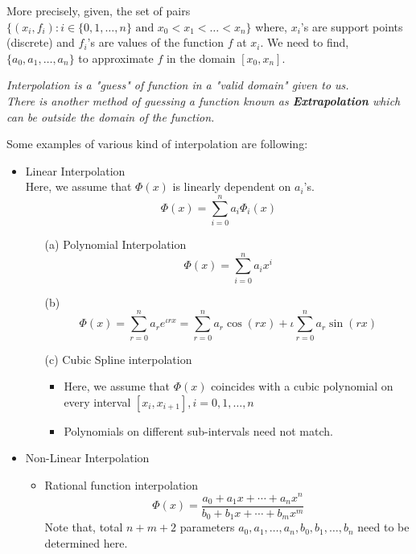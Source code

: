 More precisely, given, the set of pairs $\{(x_i,f_i): i \in \{0,1,\ldots,n\} \text{ and } x_0 < x_1 < \ldots < x_n \}$ where, $x_i$'s are support points (discrete) and $f_i$'s are values of the function $f$ at $x_i$. We need to find, $\{a_0,a_1,\ldots,a_n\}$ to approximate $f$ in the domain $[x_0,x_n]$.

\begin{rmk}
	\textit{Interpolation is a "guess" of function in a "valid domain" given to us. \\
		There is another method of guessing a function known as \textbf{Extrapolation} which can be outside the domain of the function.}
\end{rmk}



\begin{example}
	Some examples of various kind of interpolation are following:
	\begin{itemize}
		\item Linear Interpolation
		      \\ Here, we assume that $ \Phi(x) $ is linearly dependent on $a_i$'s.
		      \[
			      \Phi(x) = \sum_{i=0}^{n}a_i\Phi_i(x)
		      \]
		      \begin{itemize}
			      \item[(a)] Polynomial Interpolation
				      \[\Phi(x) = \sum_{i=0}^{n}a_ix^i\]
			      \item[(b)] \[\Phi(x) = \sum_{r=0}^{n}a_re^{\iota rx} = \sum_{r=0}^{n}a_r\cos(rx) + \iota\sum_{r=0}^{n}a_r\sin(rx) \]
			      \item[(c)] Cubic Spline interpolation
				      \begin{itemize}
					      \item Here, we assume that $ \Phi(x) $ coincides with a cubic polynomial on every interval $ [x_i,x_{i+1}], i = 0,1,\ldots,n $
					      \item Polynomials on different sub-intervals need not match.
				      \end{itemize}
		      \end{itemize}
		\item Non-Linear Interpolation
		      \begin{itemize}
			      \item Rational function interpolation
			            \[
				            \Phi(x) = \frac{a_0+a_1x+\cdots+a_nx^n}{b_0+b_1x+\cdots+b_mx^m}
			            \]
			            Note that, total $ n+m+2 $ parameters $ a_0,a_1,\ldots,a_n,b_0,b_1,\ldots,b_n $ need to be determined here.
		      \end{itemize}
	\end{itemize}

\end{example}







